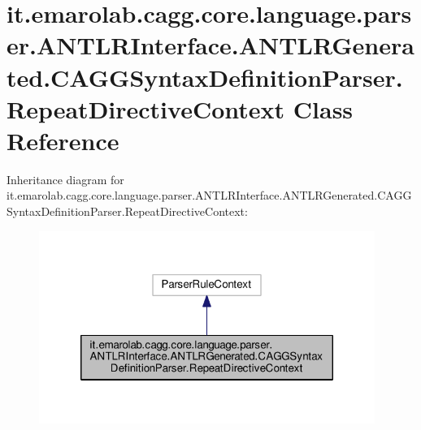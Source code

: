 \hypertarget{classit_1_1emarolab_1_1cagg_1_1core_1_1language_1_1parser_1_1ANTLRInterface_1_1ANTLRGenerated_1_c6d2080f9ca97ea76f0611a14f2333c9}{\section{it.\-emarolab.\-cagg.\-core.\-language.\-parser.\-A\-N\-T\-L\-R\-Interface.\-A\-N\-T\-L\-R\-Generated.\-C\-A\-G\-G\-Syntax\-Definition\-Parser.\-Repeat\-Directive\-Context Class Reference}
\label{classit_1_1emarolab_1_1cagg_1_1core_1_1language_1_1parser_1_1ANTLRInterface_1_1ANTLRGenerated_1_c6d2080f9ca97ea76f0611a14f2333c9}
}


Inheritance diagram for it.\-emarolab.\-cagg.\-core.\-language.\-parser.\-A\-N\-T\-L\-R\-Interface.\-A\-N\-T\-L\-R\-Generated.\-C\-A\-G\-G\-Syntax\-Definition\-Parser.\-Repeat\-Directive\-Context\-:
\nopagebreak
\begin{figure}[H]
\begin{center}
\leavevmode
\includegraphics[width=310pt]{classit_1_1emarolab_1_1cagg_1_1core_1_1language_1_1parser_1_1ANTLRInterface_1_1ANTLRGenerated_1_a0915d2e6745c5f1bb9a801c0e7fc1c6}
\end{center}
\end{figure}


